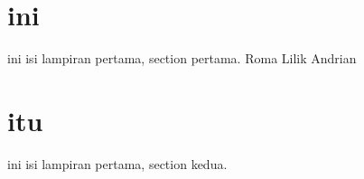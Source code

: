 \label{lamp1}

\section{ini}
ini isi lampiran pertama, section pertama. Roma Lilik Andrian

\section{itu}
ini isi lampiran pertama, section kedua.


